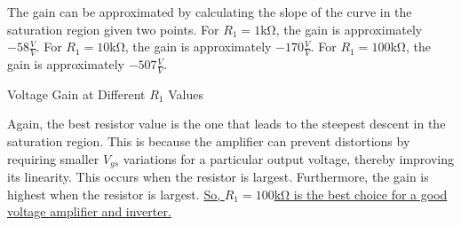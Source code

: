 \FloatBarrier

The gain can be approximated by calculating the slope of the curve in the saturation region given two points. For $R_1 = 1$\si{\kilo\ohm}, the gain is approximately $-58 \frac{V}{V}$. For $R_1 = 10$\si{\kilo\ohm}, the gain is approximately $-170 \frac{V}{V}$. For $R_1 = 100$\si{\kilo\ohm}, the gain is approximately $-507 \frac{V}{V}$. \\

\FloatBarrier

\begin{table}[h!]
	\centering
	\caption{Voltage Gain at Different $R_1$ Values}
	\label{tab:gain}
\end{table}

\FloatBarrier

Again, the best resistor value is the one that leads to the steepest descent in the saturation region. This is because the amplifier can prevent distortions by requiring smaller $V_{gs}$ variations for a particular output voltage, thereby improving its linearity. This occurs when the resistor is largest. Furthermore, the gain is highest when the resistor is largest. \uline{So, $R_1 = 100$\si{\kilo\ohm} is the best choice for a good voltage amplifier and inverter.} \\
